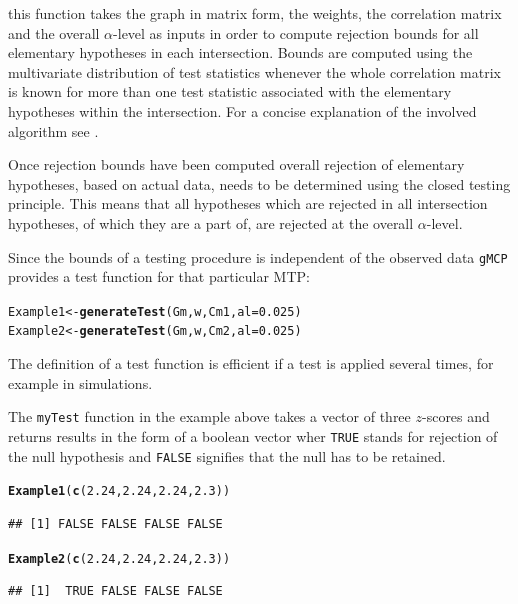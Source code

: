 \documentclass[a4paper, 11pt]{article}\usepackage[]{graphicx}\usepackage[]{color}
\makeatletter
\newcommand{\hlnum}[1]{\textcolor[rgb]{0.686,0.059,0.569}{#1}}%
\newcommand{\hlstd}[1]{\textcolor[rgb]{0.345,0.345,0.345}{#1}}%
\newcommand{\hlkwb}[1]{\textcolor[rgb]{0.69,0.353,0.396}{#1}}%
\newcommand{\hlkwc}[1]{\textcolor[rgb]{0.333,0.667,0.333}{#1}}%
\newcommand{\hlkwd}[1]{\textcolor[rgb]{0.737,0.353,0.396}{\textbf{#1}}}%
\newenvironment{kframe}{%
 \def\at@end@of@kframe{}%
 \ifinner\ifhmode%
  \def\at@end@of@kframe{\end{minipage}}%
  \begin{minipage}{\columnwidth}%
 \fi\fi%
 \def\FrameCommand##1{\hskip\@totalleftmargin \hskip-\fboxsep
 \colorbox{shadecolor}{##1}\hskip-\fboxsep
     \hskip-\linewidth \hskip-\@totalleftmargin \hskip\columnwidth}%
 \MakeFramed {\advance\hsize-\width
   \@totalleftmargin\z@ \linewidth\hsize
   \@setminipage}}%
 {\par\unskip\endMakeFramed%
 \at@end@of@kframe}
\newenvironment{knitrout}{}{} %
\newcommand{\al}{$\alpha$-level\xspace}
\newcommand{\gmcp}{\texttt{gMCP}\xspace}
\makeatother
\begin{document}
this function takes the graph in matrix form, the weights, the
correlation matrix and the overall \al as inputs in order to compute
rejection bounds for all elementary hypotheses in each intersection.
Bounds are computed using the multivariate distribution of test
statistics whenever the whole correlation matrix is known for more
than one test statistic associated with the elementary hypotheses
within the intersection. For a concise explanation of the involved
algorithm see \cite[Section 3.2]{Bretz11}.


Once rejection bounds have been computed overall rejection of
elementary hypotheses, based on actual data, needs to be determined
using the closed testing 
principle. This means that all hypotheses which are rejected in
all intersection hypotheses, of which they are a part of, are rejected
at the overall \al. 

Since the bounds of a testing procedure is independent of the
observed data \gmcp provides a test function for that particular
MTP: 

\begin{knitrout}
\color{fgcolor}\begin{kframe}
\begin{alltt}
\hlstd{Example1} \hlkwb{<-} \hlkwd{generateTest}\hlstd{(Gm, w, Cm1,} \hlkwc{al} \hlstd{=} \hlnum{0.025}\hlstd{)}
\hlstd{Example2} \hlkwb{<-} \hlkwd{generateTest}\hlstd{(Gm, w, Cm2,} \hlkwc{al} \hlstd{=} \hlnum{0.025}\hlstd{)}
\end{alltt}
\end{kframe}
\end{knitrout}


The definition of a test function is efficient if a test is applied
several times, for example in simulations.

The \texttt{myTest} function in the example above takes a vector of
three $z$-scores and returns results in the form of a boolean vector
wher \texttt{TRUE} stands for rejection of the null hypothesis and
\texttt{FALSE} signifies that the null has to be retained. 

\begin{knitrout}
\color{fgcolor}\begin{kframe}
\begin{alltt}
\hlkwd{Example1}\hlstd{(}\hlkwd{c}\hlstd{(}\hlnum{2.24}\hlstd{,} \hlnum{2.24}\hlstd{,} \hlnum{2.24}\hlstd{,} \hlnum{2.3}\hlstd{))}
\end{alltt}
\begin{verbatim}
## [1] FALSE FALSE FALSE FALSE
\end{verbatim}
\begin{alltt}
\hlkwd{Example2}\hlstd{(}\hlkwd{c}\hlstd{(}\hlnum{2.24}\hlstd{,} \hlnum{2.24}\hlstd{,} \hlnum{2.24}\hlstd{,} \hlnum{2.3}\hlstd{))}
\end{alltt}
\begin{verbatim}
## [1]  TRUE FALSE FALSE FALSE
\end{verbatim}
\end{kframe}
\end{knitrout}
\end{document}
